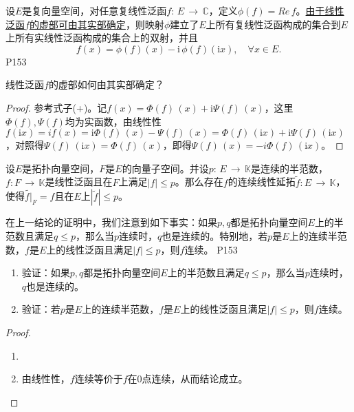\original
{
	设$E$是复向量空间，对任意复线性泛函$f:\, E\,\rightarrow\, \mathbb{C} $，定义$\phi(f)=Re\, f $。\underline{由于线性泛函$f$的虚部可由其实部确定}，则映射$\phi$建立了$E$上所有复线性泛函构成的集合到$E$上所有实线性泛函构成的集合上的双射，并且
	\begin{equation*}\tag{+}
		f(x)=\phi (f)(x)-\mathrm{i} \, \phi (f)(\mathrm{i} x),\quad \forall x\in E.
	\end{equation*}
}{P153}

\begin{proposition}
	线性泛函$f$的虚部如何由其实部确定？
\end{proposition}
\begin{proof}
	参考式子(+)。记$f(x)=\Phi(f)\,(x)+\mathrm{i}\Psi(f)\,(x) $，这里$\Phi(f),\Psi(f)$均为实函数，由线性性$f(\mathrm{i}x)=if(x)=\mathrm{i}\Phi(f)\, (x) -\Psi(f) \, (x)= \Phi(f)\, (\mathrm{i}x) +\mathrm{i}\Psi(f)\, (\mathrm{i}x) $，对照得$\Psi(f)\,(\mathrm{i}x)=\Phi(f)\,(x) $，即得$\Psi(f)\, (x)=-i\Phi(f)\, (\mathrm{i}x) $。
\end{proof}

\begin{corollary}
	设$E$是拓扑向量空间，$F$是$E$的向量子空间。并设$p:\,E \, \rightarrow \, \mathbb{K} $是连续的半范数，$f:F\, \rightarrow \, \mathbb{K} $是线性泛函且在$F$上满足$|f|\leq p $。那么存在$f$的连续线性延拓$\tilde{f}: E\, \rightarrow \, \mathbb{K} $，使得$\tilde{f\big| }_{F} =f $且在$E$上$|\tilde{f}|\leq p $。
\end{corollary}

\original
{
	在上一结论的证明中，我们注意到如下事实：如果$p,q$都是拓扑向量空间$E$上的半范数且满足$q\leq p$，那么当$p$连续时，$q$也是连续的。特别地，若$p$是$E$上的连续半范数，$f$是$E$上的线性泛函且满足$|f|\leq p$，则$f$连续。
}{P153}

\begin{proposition}
	\begin{enumerate}
		\item 验证：如果$p,q$都是拓扑向量空间$E$上的半范数且满足$q\leq p$，那么当$p$连续时，$q$也是连续的。
		\item 验证：若$p$是$E$上的连续半范数，$f$是$E$上的线性泛函且满足$|f|\leq p$，则$f$连续。
	\end{enumerate}
\end{proposition}
\begin{proof}
	\begin{enumerate}
		\item 
		\item 由线性性，$f$连续等价于$f$在$0$点连续，从而结论成立。
	\end{enumerate}
\end{proof}











